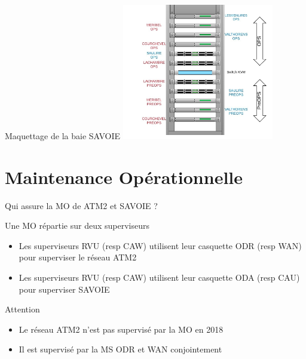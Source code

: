 \documentclass[10pt]{beamer}
\begin{document}
\begin{center}
\begin{frame}{Maquettage de la baie SAVOIE}
\includegraphics[width=250px]{Schemas/Maquettage_Savoie.jpg}
\end{frame}
\end{center}

\section{Maintenance Opérationnelle}
\begin{frame}{Qui assure la MO de ATM2 et SAVOIE ?}
\begin{block}{Une MO répartie sur deux superviseurs}
\begin{itemize}
\item Les superviseurs RVU (resp CAW) utilisent leur casquette ODR (resp WAN) pour superviser le réseau ATM2
\item Les superviseurs RVU (resp CAW) utilisent leur casquette ODA (resp CAU) pour superviser SAVOIE
\end{itemize}
\end{block}
\begin{alertblock}{Attention}
\begin{itemize}
    \item Le réseau ATM2 n'est pas supervisé par la MO en 2018
    \item Il est supervisé par la MS ODR et WAN conjointement 
\end{itemize}
\end{alertblock}
\end{frame}
\end{document}

